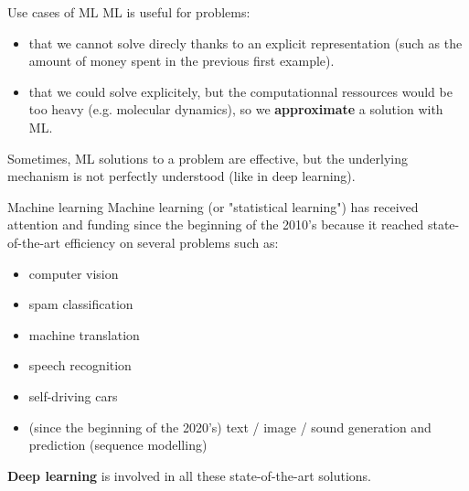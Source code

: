\documentclass[usenames,dvipsnames]{beamer}
\begin{document}
\begin{frame}{Use cases of ML}
    ML is useful for problems:
\begin{itemize}
    \item that we cannot solve direcly thanks to an explicit representation (such as the amount of money spent in the previous first example).
    \item that we could solve explicitely, but the computationnal ressources would be too heavy (e.g. molecular dynamics), so we \textbf{approximate} a solution with ML.
\end{itemize}

    Sometimes, ML solutions to a problem are effective, but the underlying mechanism is not perfectly understood (like in deep learning).
\end{frame}


\begin{frame}{Machine learning}
    Machine learning (or "statistical learning") has received attention and funding since the beginning of the 2010's because it reached
    state-of-the-art efficiency on several problems such as:
    \begin{itemize}
        \item computer vision
        \item spam classification
        \item machine translation
        \item speech recognition
        \item self-driving cars
        \item (since the beginning of the 2020's) text / image / sound generation and prediction (sequence modelling)
    \end{itemize}
    \textbf{{Deep learning}} is involved in all these state-of-the-art solutions.
\end{frame}
\end{document}
